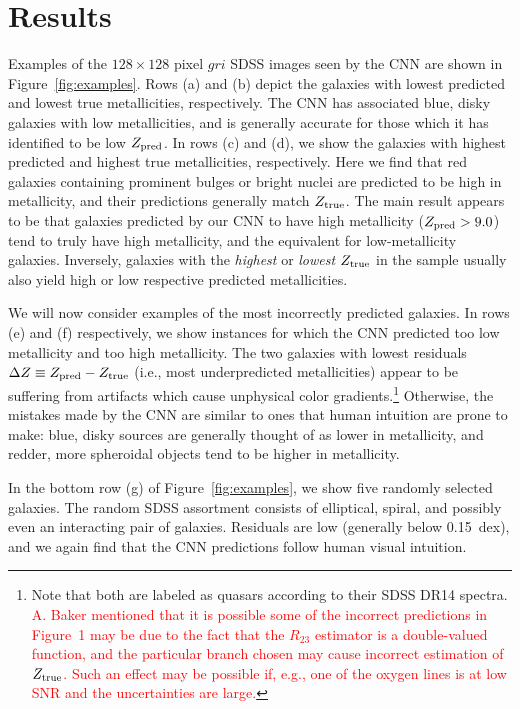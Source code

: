 \documentclass[fleqn,usenatbib]{mnras}
\newcommand{\editorial}[1]{\textcolor{red}{#1}}
\begin{document}
\section{Results}\label{sec:results}

Examples of the $128 \times 128$ pixel $gri$ SDSS images seen by the CNN are shown in Figure~\ref{fig:examples}.
Rows (a) and (b) depict the galaxies with lowest predicted and lowest true metallicities, respectively.
The CNN has associated blue, disky galaxies with low metallicities, and is generally accurate for those which it has identified to be low $Z_{\rm pred}$.
In rows (c) and (d), we show the galaxies with highest predicted and highest true metallicities, respectively.
Here we find that red galaxies containing prominent bulges or bright nuclei are predicted to be high in metallicity, and their predictions generally match $Z_{\rm true}$.
The main result appears to be that galaxies predicted by our CNN to have high metallicity ($Z_{\rm pred} > 9.0$) tend to truly have high metallicity, and the equivalent for low-metallicity galaxies.
Inversely, galaxies with the \textit{highest} or \textit{lowest} $Z_{\rm true}$ in the sample usually also yield high or low respective predicted metallicities.

We will now consider examples of the most incorrectly predicted galaxies.
In rows (e) and (f) respectively, we show instances for which the CNN predicted too low metallicity and too high metallicity.
The two galaxies with lowest residuals $\Delta Z \equiv Z_{\rm pred} - Z_{\rm true}$ (i.e., most underpredicted metallicities) appear to be suffering from artifacts which cause unphysical color gradients.\footnote{Note that both are labeled as quasars according to their SDSS DR14 spectra. \editorial{A. Baker mentioned that it is possible some of the incorrect predictions in Figure~1 may be due to the fact that the $R_{23}$ estimator is a double-valued function, and the particular branch chosen may cause incorrect estimation of $Z_{\rm true}$. Such an effect may be possible if, e.g., one of the oxygen lines is at low SNR and the uncertainties are large.}}
Otherwise, the mistakes made by the CNN are similar to ones that human intuition are prone to make: blue, disky sources are generally thought of as lower in metallicity, and redder, more spheroidal objects tend to be higher in metallicity.

In the bottom row (g) of Figure~\ref{fig:examples}, we show five randomly selected galaxies.
The random SDSS assortment consists of elliptical, spiral, and possibly even an interacting pair of galaxies.
Residuals are low (generally below 0.15~dex), and we again find that the CNN predictions follow human visual intuition.
\end{document}
